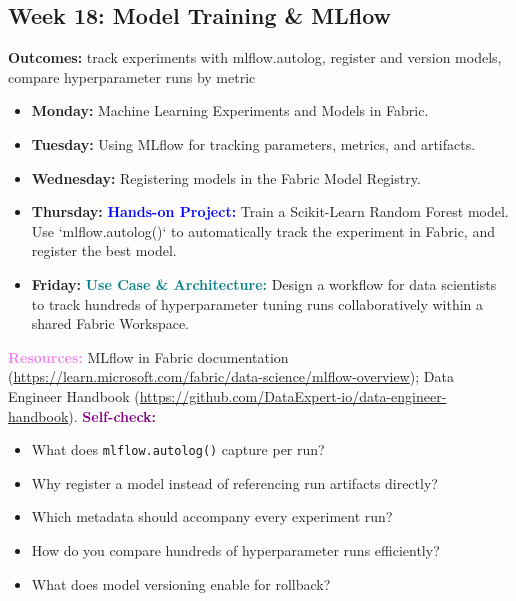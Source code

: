 \documentclass[11pt, a4paper]{article}
\newcommand{\project}[1]{\vspace{1mm}\noindent\textbf{\textcolor{blue}{Hands-on Project:}} #1}
\newcommand{\usecase}[1]{\vspace{1mm}\noindent\textbf{\textcolor{teal}{Use Case \& Architecture:}} #1}
\newcommand{\dayitem}[2]{\item \textbf{#1:} #2}
\newcommand{\resources}[1]{\vspace{1mm}\noindent\textbf{\textcolor{violet}{Resources:}} #1}
\newcommand{\selfcheck}[1]{\vspace{1mm}\noindent\textbf{\textcolor{purple}{Self-check:}} #1}
\begin{document}
\subsection*{Week 18: Model Training \& MLflow}
\par\noindent\textbf{Outcomes:} track experiments with mlflow.autolog, register and version models, compare hyperparameter runs by metric
\begin{itemize}[label=-]
    \dayitem{Monday}{Machine Learning Experiments and Models in Fabric.}
    \dayitem{Tuesday}{Using MLflow for tracking parameters, metrics, and artifacts.}
    \dayitem{Wednesday}{Registering models in the Fabric Model Registry.}
    \dayitem{Thursday}{\project{Train a Scikit-Learn Random Forest model. Use `mlflow.autolog()` to automatically track the experiment in Fabric, and register the best model.}}
    \dayitem{Friday}{\usecase{Design a workflow for data scientists to track hundreds of hyperparameter tuning runs collaboratively within a shared Fabric Workspace.}}
\end{itemize}
\resources{MLflow in Fabric documentation (\url{https://learn.microsoft.com/fabric/data-science/mlflow-overview}); Data Engineer Handbook (\url{https://github.com/DataExpert-io/data-engineer-handbook}).}
\selfcheck{
\begin{itemize}[label=$\bullet$, leftmargin=6mm, itemsep=0pt]
    \item What does \texttt{mlflow.autolog()} capture per run?
    \item Why register a model instead of referencing run artifacts directly?
    \item Which metadata should accompany every experiment run?
    \item How do you compare hundreds of hyperparameter runs efficiently?
    \item What does model versioning enable for rollback?
\end{itemize}
}
\end{document}
